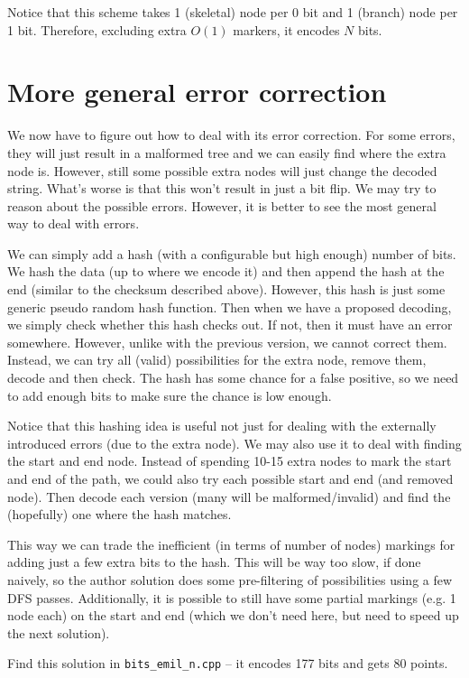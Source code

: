 \documentclass[12pt]{article}
\begin{document}
Notice that this scheme takes 1 (skeletal) node per 0 bit and 1 (branch) node per 1 bit. Therefore, excluding extra $O(1)$ markers, it encodes $N$ bits.

\section*{More general error correction}

We now have to figure out how to deal with its error correction. For some errors, they will just result in a malformed tree and we can easily find where the extra node is. However, still some possible extra nodes will just change the decoded string. What's worse is that this won't result in just a bit flip. We may try to reason about the possible errors. However, it is better to see the most general way to deal with errors.

We can simply add a hash (with a configurable but high enough) number of bits. We hash the data (up to where we encode it) and then append the hash at the end (similar to the checksum described above). However, this hash is just some generic pseudo random hash function. Then when we have a proposed decoding, we simply check whether this hash checks out. If not, then it must have an error somewhere. However, unlike with the previous version, we cannot correct them. Instead, we can try all (valid) possibilities for the extra node, remove them, decode and then check. The hash has some chance for a false positive, so we need to add enough bits to make sure the chance is low enough.

Notice that this hashing idea is useful not just for dealing with the externally introduced errors (due to the extra node). We may also use it to deal with finding the start and end node. Instead of spending 10-15 extra nodes to mark the start and end of the path, we could also try each possible start and end (and removed node). Then decode each version (many will be malformed/invalid) and find the (hopefully) one where the hash matches.

This way we can trade the inefficient (in terms of number of nodes) markings for adding just a few extra bits to the hash. This will be way too slow, if done naively, so the author solution does some pre-filtering of possibilities using a few DFS passes. Additionally, it is possible to still have some partial markings (e.g. 1 node each) on the start and end (which we don't need here, but need to speed up the next solution).

Find this solution in \verb|bits_emil_n.cpp| -- it encodes 177 bits and gets 80 points.
\end{document}
